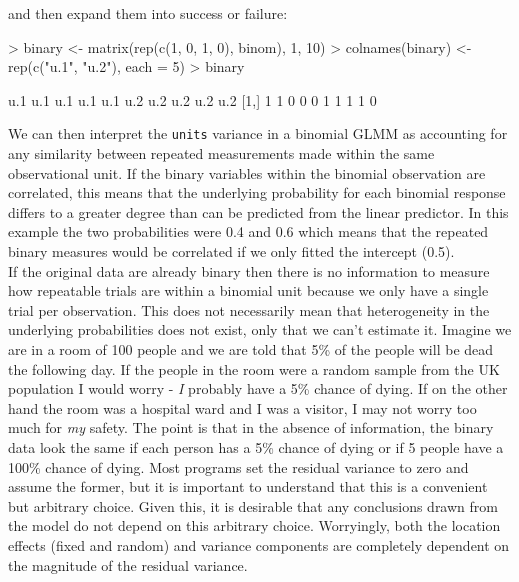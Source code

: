 \documentclass{article}
\begin{document}
and then expand them into success or failure:

\begin{Schunk}
\begin{Sinput}
> binary <- matrix(rep(c(1, 0, 1, 0), binom), 1, 10)
> colnames(binary) <- rep(c("u.1", "u.2"), each = 5)
> binary
\end{Sinput}
\begin{Soutput}
     u.1 u.1 u.1 u.1 u.1 u.2 u.2 u.2 u.2 u.2
[1,]   1   1   0   0   0   1   1   1   1   0
\end{Soutput}
\end{Schunk}

We can then interpret the \texttt{units} variance in a binomial GLMM as accounting for any similarity between repeated measurements made within the same observational unit. If the binary variables within the binomial observation are correlated, this means that the underlying probability for each binomial response differs to a greater degree than can be predicted from the linear predictor. In this example the two probabilities were 0.4 and 0.6 which means that the repeated binary measures would be correlated if we only fitted the intercept (0.5).\\  

If the original data are already binary then there is no information to measure how repeatable trials are within a binomial unit because we only have a single trial per observation. This does not necessarily mean that heterogeneity in the underlying probabilities does not exist, only that we can't estimate it. Imagine we are in a room of 100 people and we are told that 5\% of the people will be dead the following day.  If the people in the room were a random sample from the UK population I would worry - \emph{I} probably have a 5\% chance of dying. If on the other hand the room was a hospital ward and I was a visitor, I may not worry too much for \emph{my} safety. The point is that in the absence of information, the binary data look the same if each person has a 5\% chance of dying or if 5 people have a 100\% chance of dying.  Most programs set the residual variance to zero and assume the former, but it is important to understand that this is a convenient but arbitrary choice. Given this, it is desirable that any conclusions drawn from the model do not depend on this arbitrary choice. Worryingly, both the location effects (fixed and random) and variance components are completely dependent on the magnitude of the residual variance.\\
\end{document}

